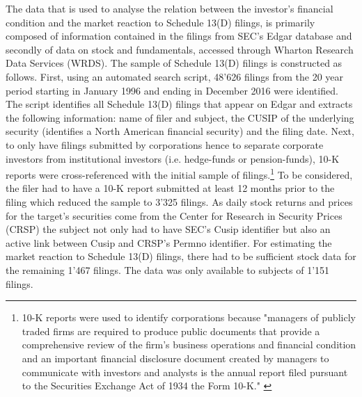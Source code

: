 \documentclass[12pt]{article}
\begin{document}
\noindent The data that is used to analyse the relation between the investor's financial condition and the market reaction to Schedule 13(D) filings,  is primarily composed of information contained in the filings from SEC's Edgar database and secondly of data on stock and fundamentals,  accessed through Wharton Research Data Services (WRDS). The sample of Schedule 13(D) filings is constructed as follows. First, using an automated search script, 48'626 filings from the 20 year period starting in January 1996 and ending in December 2016 were identified.  The script identifies all Schedule 13(D) filings that appear on Edgar and extracts the following information: name of filer and subject, the CUSIP of the underlying security (identifies a North American financial security) and the filing date. Next, to only have filings submitted by corporations hence to separate corporate investors from institutional investors (i.e. hedge-funds or pension-funds), 10-K reports were cross-referenced with the initial sample of filings.\footnote{10-K reports were used to identify corporations because "managers of publicly traded firms are required to produce public documents that provide a comprehensive review of the firm’s business operations and financial condition and an important financial disclosure document created by managers to communicate with investors and analysts is the annual report filed pursuant to the Securities Exchange Act of 1934 the Form 10-K." \citep[p. 1643]{Loughran2014}} To be considered, the filer had to have a 10-K report submitted at least 12 months prior to the filing which reduced the sample to 3'325 filings. As daily stock returns and prices for the target's securities come from the Center for Research in Security Prices (CRSP) the subject not only had to have SEC's Cusip identifier but also an active link between Cusip and CRSP's Permno identifier. For estimating the market reaction to Schedule 13(D) filings, there had to be sufficient stock data for the remaining 1'467 filings. The data was only available to subjects of 1'151 filings. 
\end{document}
